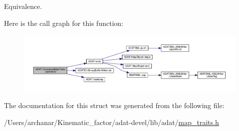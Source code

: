 Equivalence. 

Here is the call graph for this function\+:
\nopagebreak
\begin{figure}[H]
\begin{center}
\leavevmode
\includegraphics[width=350pt]{dd/d81/structADAT_1_1UnorderedMapTraits_a14c1daf5e4530fc4c749ec681103e7a2_cgraph}
\end{center}
\end{figure}


The documentation for this struct was generated from the following file\+:\begin{DoxyCompactItemize}
\item 
/\+Users/archanar/\+Kinematic\+\_\+factor/adat-\/devel/lib/adat/\mbox{\hyperlink{adat-devel_2lib_2adat_2map__traits_8h}{map\+\_\+traits.\+h}}\end{DoxyCompactItemize}
